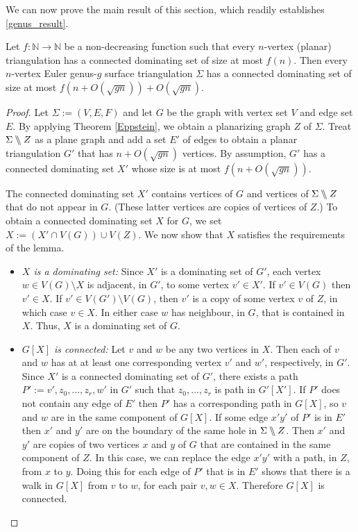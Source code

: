 We can now prove the main result of this section, which readily establishes \cref{genus_result}.

\begin{lem}\label{generic_surface_thm}
    Let $f:\mathbb{N} \longrightarrow \mathbb{N}$ be a non-decreasing function such that every $n$-vertex (planar) triangulation has a connected dominating set of size at most $f(n)$. Then every $n$-vertex Euler genus-$g$ surface triangulation $\Sigma$ has a connected dominating set of size at most $f(n + O(\sqrt{gn})) + O(\sqrt{gn})$.
\end{lem}

\begin{proof}
Let $\Sigma:=(V,E,F)$ and let $G$ be the graph with vertex set $V$ and edge set $E$.
By applying Theorem \ref{Eppstein}, we obtain a planarizing graph
$Z$ of $\Sigma$. Treat $\Sigma \bbslash Z$ as a plane graph and add a set $E'$ of edges to obtain a planar triangulation $G'$ that has $n+O(\sqrt{gn})$ vertices. By assumption, $G'$ has a connected dominating set $X'$ whose size is at most $f(n + O(\sqrt{gn}))$.

The connected dominating set $X'$ contains vertices of $G$ and vertices of $\Sigma\bbslash Z$ that do not appear in $G$.  (These latter vertices are copies of vertices of $Z$.) To obtain a connected dominating set $X$ for $G$, we set $X:=(X'\cap V(G))\cup V(Z)$.   We now show that $X$ satisfies the requirements of the lemma.
\begin{itemize}
    \item \emph{$X$ is a dominating set:} Since $X'$ is a dominating set of $G'$, each vertex $w\in V(G)\setminus X$ is adjacent, in $G'$, to some vertex $v'\in X'$.  If $v'\in V(G)$ then $v'\in X$.  If $v'\in V(G')\setminus V(G)$, then $v'$ is a copy of some vertex $v$ of $Z$, in which case $v\in X$. In either case $w$ has neighbour, in $G$, that is contained in $X$.  Thus, $X$ is a dominating set of $G$.

    \item \emph{$G[X]$ is connected:} Let $v$ and $w$ be any two vertices in $X$. Then each of $v$ and $w$ has at at least one corresponding vertex $v'$ and $w'$, respectively, in $G'$.   Since $X'$ is a connected dominating set of $G'$, there exists a path $P':=v',z_0,\ldots,z_r,w'$ in $G'$ such that $z_0,\ldots,z_r$ is path in $G'[X']$.  If $P'$ does not contain any edge of $E'$ then $P'$ has a corresponding path in $G[X]$, so $v$ and $w$ are in the same component of $G[X]$.  If some edge $x'y'$ of $P'$ is in $E'$ then $x'$ and $y'$ are on the boundary of the same hole in $\Sigma\bbslash Z$.  Then $x'$ and $y'$ are copies of two vertices $x$ and $y$ of $G$ that are contained in the same component of $Z$.  In this case, we can replace the edge $x'y'$ with a path, in $Z$, from $x$ to $y$.  Doing this for each edge of $P'$ that is in $E'$ shows that there is a walk in $G[X]$ from $v$ to $w$, for each pair $v,w\in X$. Therefore $G[X]$ is connected.


\end{itemize}
\end{proof}
